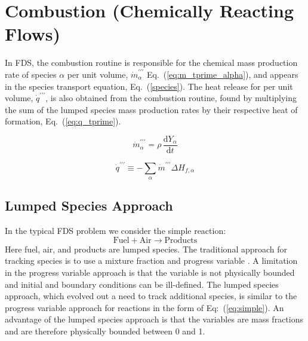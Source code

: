 \chapter{Combustion (Chemically Reacting Flows)}

\label{combustionsection}
In FDS, the combustion routine is responsible for the chemical mass production rate of species $\alpha$ per unit volume, $\dot{m}^{\prime\prime\prime}_{\alpha}$ Eq.~(\ref{eq:m_tprime_alpha}), and appears in the species transport equation, Eq.~(\ref{species}). The heat release for per unit volume, $\dot{q}^{\prime\prime\prime}$, is also obtained from the combustion routine, found by multiplying the sum of the lumped species mass production rates by their respective heat of formation, Eq.~(\ref{eq:q_tprime}).

\begin{equation}\label{eq:m_tprime_alpha}
\dot{m}^{\prime\prime\prime}_{\alpha}=\rho \,\frac{\mbox{d}Y_{\alpha}}{\mbox{d}t}
\end{equation}

\begin{equation}\label{eq:q_tprime}
\dot{q}^{\prime\prime\prime} \equiv -\displaystyle \sum_{\alpha} \dot{m}^{\prime\prime\prime} \Delta H_{f,\alpha}
\end{equation}


\section{Lumped Species Approach}
In the typical FDS problem we consider the simple reaction:
\begin{equation}\label{eq:simple}
\mathrm{Fuel + Air \rightarrow Products}
\end{equation}
Here fuel, air, and products are lumped species. The traditional approach for tracking species is to use a mixture fraction and progress variable \cite{fox2003}. A limitation in the progress variable approach is that the variable is not physically bounded and initial and boundary conditions can be ill-defined. The lumped species approach, which evolved out a need to track additional species, is similar to the progress variable approach for reactions in the form of Eq:~(\ref{eq:simple}). An advantage of the lumped species approach is that the variables are mass fractions and are therefore physically bounded between 0 and 1. 

